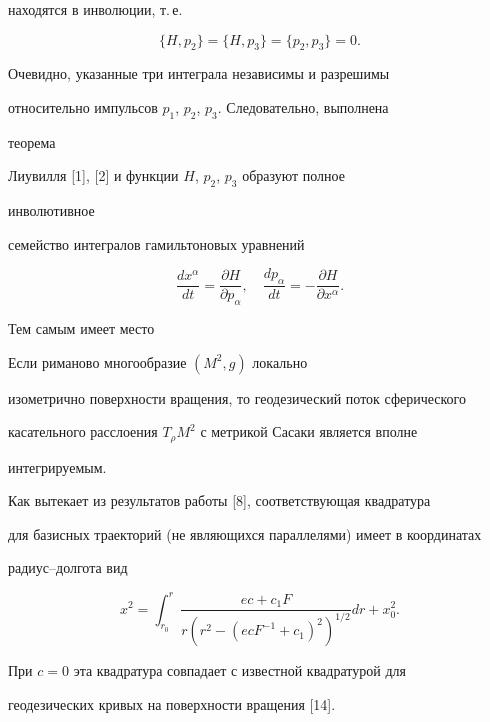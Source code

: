 находятся в инволюции, т.\,е. 


$$ 


\{H,p_2\}=\{H,p_3\}=\{p_2,p_3\}=0. 


$$ 


Очевидно, указанные три интеграла независимы и разрешимы 


относительно импульсов $p_1$, $p_2$, $p_3$. Следовательно, выполнена 


теорема 


Лиувилля [1], [2] и функции $H$, $p_2$, $p_3$ образуют полное 


инволютивное 


семейство интегралов гамильтоновых уравнений 


$$ 


\frac{d x^\alpha}{d t}=\frac{\partial H}{\partial p_\alpha},\quad 


\frac{d p_\alpha}{d t}=-\frac{\partial H}{\partial x^\alpha}. 


$$ 


Тем самым имеет место 


 


\begin{thm} 


Если риманово многообразие $(M^2,g)$ локально 


изометрично поверхности вращения, то геодезический поток сферического 


касательного расслоения $T_\rho M^2$ с метрикой Сасаки является вполне 


интегрируемым. 


\end{thm} 


 


Как вытекает из результатов работы [8], соответствующая квадратура 


для базисных траекторий (не являющихся параллелями) имеет в координатах 


радиус--долгота вид 


$$ 


x^2=\int^r_{r_0} 


\frac{e c+c_1F}{r(r^2-(e c F^{-1}+c_1)^2)^{1/2}}d r+x^2_0. 


$$ 


При $c=0$ эта квадратура совпадает с известной квадратурой для 


геодезических кривых на поверхности вращения [14]. 


